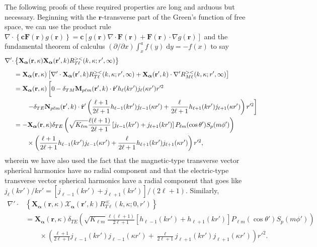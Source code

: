 \documentclass{article}
\begin{document}
The following proofs of these required properties are long and arduous but necessary. Beginning with the $\mathbf{r}$-transverse part of the Green's function of free space, we can use the product rule $\nabla\cdot\left\{\mathbf{c}\mathbf{F}(\mathbf{r})g(\mathbf{r})\right\} = \mathbf{c}\left[g(\mathbf{r})\nabla\cdot\mathbf{F}(\mathbf{r}) + \mathbf{F}(\mathbf{r})\cdot\nabla g(\mathbf{r})\right]$ and the fundamental theorem of calculus $(\partial/\partial x)\int_x^a f(y)\;\mathrm{d}y = -f(x)$ to say
\begin{equation}
\begin{split}
\nabla'\cdot&\left\{\mathbf{X}_{\bm{\alpha}}(\mathbf{r},\kappa)\mathbf{X}_{\bm{\alpha}}(\mathbf{r}',k)R_{T\ell}^{><}(k,\kappa;r',\infty)\right\}\\[0.5em]
&= \mathbf{X}_{\bm{\alpha}}(\mathbf{r},\kappa)\left[\nabla'\cdot\mathbf{X}_{\bm{\alpha}}(\mathbf{r}',k)R_{T\ell}^{><}(k,\kappa;r',\infty) + \mathbf{X}_{\bm{\alpha}}(\mathbf{r}',k)\cdot\nabla'R_{M\ell}^{><}(k,\kappa;r',\infty)\right]\\
&= \mathbf{X}_{\bm{\alpha}}(\mathbf{r},\kappa)\left[ \vphantom{\frac{\ell}{2\ell + 1}} 0 - \delta_{TM}\mathbf{M}_{p\ell m}(\mathbf{r}',k)\cdot\hat{\mathbf{r}}'h_\ell(kr')j_\ell(\kappa r')r'^2\right.\\
&\left.\qquad- \delta_{TE}\mathbf{N}_{p\ell m}(\mathbf{r}',k)\cdot\hat{\mathbf{r}}'\left(\frac{\ell + 1}{2\ell + 1}h_{\ell - 1}(kr')j_{\ell - 1}(\kappa r') + \frac{\ell}{2\ell + 1}h_{\ell + 1}(kr')j_{\ell + 1}(\kappa r')\right)r'^2\right]\\
&= -\mathbf{X}_{\bm{\alpha}}(\mathbf{r},\kappa)\delta_{TE}\left(\sqrt{K_{\ell m}}\frac{\ell(\ell + 1)}{2\ell + 1}\left[j_{\ell - 1}(kr') + j_{\ell + 1}(kr')\right]P_{\ell m}(\cos\theta')S_p(m\phi')\right)\\
&\qquad\times\left(\frac{\ell + 1}{2\ell + 1}h_{\ell - 1}(kr')j_{\ell - 1}(\kappa r') + \frac{\ell}{2\ell + 1}h_{\ell + 1}(kr')j_{\ell + 1}(\kappa r')\right)r'^2,
\end{split}
\end{equation}
wherein we have also used the fact that the magnetic-type transverse vector spherical harmonics have no radial component and that the electric-type transverse vector spherical harmonics have a radial component that goes like $j_{\ell}(kr')/kr' = [j_{\ell - 1}(kr') + j_{\ell + 1}(kr')]/(2\ell + 1)$. Similarly,
\begin{equation}
\begin{split}
\nabla'\cdot&\left\{\mathbf{X}_{\bm{\alpha}}(\mathbf{r},\kappa)\bm{\mathcal{X}}_{\bm{\alpha}}(\mathbf{r}',k)R_{T\ell}^\ll(k,\kappa;0,r')\right\}\\
&= \mathbf{X}_{\bm{\alpha}}(\mathbf{r},\kappa)\delta_{TE}\left(\sqrt{K_{\ell m}}\frac{\ell(\ell + 1)}{2\ell + 1}\left[h_{\ell - 1}(kr') + h_{\ell + 1}(kr')\right]P_{\ell m}(\cos\theta')S_p(m\phi')\right)\\
&\qquad\times\left(\frac{\ell + 1}{2\ell + 1}j_{\ell - 1}(kr')j_{\ell - 1}(\kappa r') + \frac{\ell}{2\ell + 1}j_{\ell + 1}(kr')j_{\ell + 1}(\kappa r')\right)r'^2.
\end{split}
\end{equation}
\end{document}
